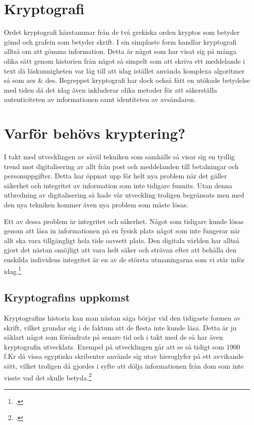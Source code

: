 
\section{Kryptografi} %
Ordet kryptografi härstammar från de två grekiska orden
kryptos som betyder gömd och grafein som betyder skrift.
I sin simplaste form handlar kryptografi alltså om att
gömma information. Detta är något som har visat sig på många
olika sätt genom historien från något så simpelt som att skriva
ett meddelande i text då läskunnigheten var låg till
att idag istället använda komplexa algoritmer så som \acrshort{aes} \& \acrshort{des}.
Begreppet kryptografi har dock också fått en utökade betydelse
med tiden då det idag även inkluderar olika metoder för att
säkerställa autenticiteten av informationen samt identiteten av avsändaren.

\section{Varför behövs kryptering?} %
\label{sec:varfor-behovs-kryptering}
I takt med utvecklingen av såväl tekniken som samhälle så visar sig en tydlig trend mot digitalisering av allt från
post och meddelanden till betalningar och personuppgifter. Detta har öppnat upp för helt
nya problem när det gäller säkerhet och integritet av information som inte tidigare funnits. Utan denna utbredning av
digitalisering så hade vår utveckling troligen begränsats men med den nya tekniken kommer även nya problem
som måste lösas.

Ett av dessa problem är integritet och säkerhet. Något som tidigare kunde lösas genom att låsa in informationen på
en fysisk plats något som inte fungerar när allt ska vara tillgängligt hela tide oavsett plats. Den digitala världen har alltså gjort det nästan
omöjligt att vara helt säker och strävan efter att behålla den enskilda individens integritet
är en av de största utmaningarna som vi står inför idag.\footcite{diffie2010privacy}

\subsection{Kryptografins uppkomst} %
Kryptografins historia kan man nästan säga börjar vid den
tidigaste formen av skrift, vilket grundar sig i de faktum att
de flesta inte kunde läsa. Detta är ju såklart något som förändrats
på senare tid och i takt med de så har även kryptografin utvecklats.
Exempel på utvecklingen går att se så tidigt som 1900 f.Kr då vissa egyptiska
skribenter använde sig utav hieroglyfer på ett avvikande sätt, vilket
troligen då gjordes i syfte att dölja informationen från dom som inte
visste vad det skulle betyda.\footcite{kryptografi-historia-1}

